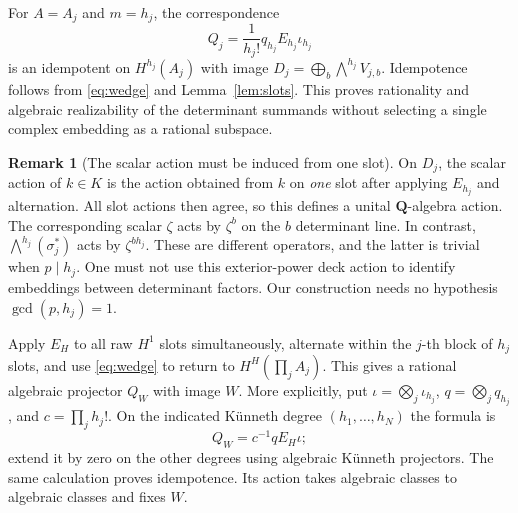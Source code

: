 \documentclass[11pt]{article}
\theoremstyle{definition}
\newtheorem{remark}[theorem]{Remark}
\newcommand{\Q}{\mathbf Q}
\begin{document}
For $A=A_j$ and $m=h_j$, the correspondence
\begin{equation}\label{eq:Dprojector}
 Q_j=\frac1{h_j!}q_{h_j}E_{h_j}\iota_{h_j}
\end{equation}
is an idempotent on $H^{h_j}(A_j)$ with image
$D_j=\bigoplus_b\bigwedge^{h_j}V_{j,b}$. Idempotence follows from
\eqref{eq:wedge} and Lemma~\ref{lem:slots}. This proves rationality and
algebraic realizability of the determinant summands without selecting a single
complex embedding as a rational subspace.

\begin{remark}[The scalar action must be induced from one slot]\label{rem:scalar}
On $D_j$, the scalar action of $k\in K$ is the action obtained from $k$ on
\emph{one} slot after applying $E_{h_j}$ and alternation. All slot actions then
agree, so this defines a unital $\Q$-algebra action. The corresponding scalar
$\zeta$ acts by $\zeta^b$ on the $b$ determinant line. In contrast,
$\bigwedge^{h_j}(\sigma_j^*)$ acts by $\zeta^{b h_j}$. These are different
operators, and the latter is trivial when $p\mid h_j$. One must not use this
exterior-power deck action to identify embeddings between determinant factors.
Our construction needs no hypothesis $\gcd(p,h_j)=1$.
\end{remark}

Apply $E_H$ to all raw $H^1$ slots simultaneously, alternate within the $j$-th
block of $h_j$ slots, and use \eqref{eq:wedge} to return to
$H^H(\prod_j A_j)$. This gives a rational algebraic projector $Q_W$ with image
$W$. More explicitly, put $\iota=\bigotimes_j\iota_{h_j}$,
$q=\bigotimes_j q_{h_j}$, and $c=\prod_jh_j!$. On the indicated
K\"unneth degree $(h_1,\ldots,h_N)$ the formula is
\begin{equation}\label{eq:globalprojector}
 Q_W=c^{-1}qE_H\iota;
\end{equation}
extend it by zero on the other degrees using algebraic K\"unneth projectors.
The same calculation proves idempotence. Its action takes algebraic classes
to algebraic classes and fixes $W$.
\end{document}
